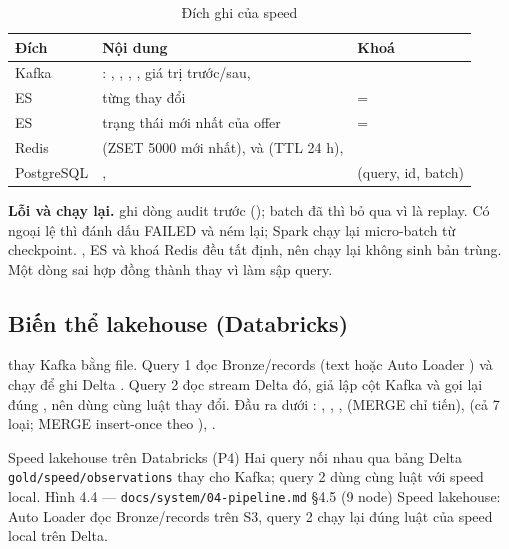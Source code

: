 \begin{xltabular}{\linewidth}{@{}L{48mm}Y L{24mm}@{}}
  \caption{Đích ghi của speed}\label{tab:speed-sinks}\\
  \toprule
  \textbf{Đích} & \textbf{Nội dung} & \textbf{Khoá} \\
  \midrule
  Kafka  & : , , , , giá trị trước/sau,  &  \\
  ES  & từng thay đổi &  =  \\
  ES  & trạng thái mới nhất của offer &  =  \\
  Redis &  (ZSET 5000 mới nhất),  và  (TTL 24 h),  & \\
  PostgreSQL & ,  & (query, id, batch) \\
  \bottomrule
\end{xltabular}

\textbf{Lỗi và chạy lại.}  ghi dòng audit trước (); batch đã  thì bỏ qua vì là replay.
Có ngoại lệ thì đánh dấu FAILED và ném lại; Spark chạy lại micro-batch từ checkpoint. ,  ES và khoá Redis đều tất định,
nên chạy lại không sinh bản trùng. Một dòng sai hợp đồng thành  thay vì làm sập query.

\subsection{Biến thể lakehouse (Databricks)}
 thay Kafka bằng file. Query 1 đọc Bronze/records (text hoặc Auto Loader ) và chạy
 để ghi Delta . Query 2 đọc stream Delta đó, giả lập cột Kafka và gọi lại đúng
, nên dùng cùng luật thay đổi. Đầu ra dưới : , ,
,  (MERGE chỉ tiến),  (cả 7 loại; MERGE insert-once theo ), .

  {Speed lakehouse trên Databricks (P4)}
  {Hai query nối nhau qua bảng Delta \texttt{gold/speed/observations} thay cho Kafka; query 2 dùng cùng luật với speed local.}
  {Hình 4.4 — \texttt{docs/system/04-pipeline.md} §4.5 (9 node)}
  {Speed lakehouse: Auto Loader đọc Bronze/records trên S3, query 2 chạy lại đúng luật của speed local trên Delta.}

